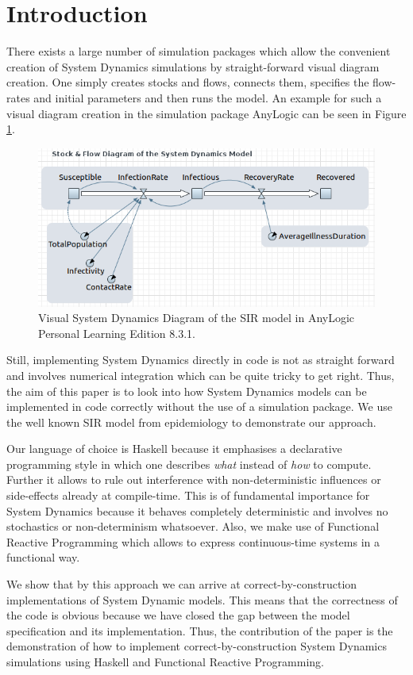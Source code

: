 \section{Introduction}
There exists a large number of simulation packages which allow the convenient creation of System Dynamics simulations by straight-forward visual diagram creation. One simply creates stocks and flows, connects them, specifies the flow-rates and initial parameters and then runs the model. An example for such a visual diagram creation in the simulation package AnyLogic can be seen in Figure \ref{fig:sir_stockflow_diagram}.

\begin{figure}
	\centering
	\includegraphics[width=.5\textwidth, angle=0]{./fig/SIR_SD_STOCKFLOW_DIAGRAMM.png}
	\caption{Visual System Dynamics Diagram of the SIR model in AnyLogic Personal Learning Edition 8.3.1.}
	\label{fig:sir_stockflow_diagram}
\end{figure}

Still, implementing System Dynamics directly in code is not as straight forward and involves numerical integration which can be quite tricky to get right. Thus, the aim of this paper is to look into how System Dynamics models can be implemented in code correctly without the use of a simulation package. We use the well known SIR model \cite{kermack_contribution_1927} from epidemiology to demonstrate our approach.

Our language of choice is Haskell because it emphasises a declarative programming style in which one describes \textit{what} instead of \textit{how} to compute. Further it allows to rule out interference with non-deterministic influences or side-effects already at compile-time. This is of fundamental importance for System Dynamics because it behaves completely deterministic and involves no stochastics or non-determinism whatsoever. Also, we make use of Functional Reactive Programming which allows to express continuous-time systems in a functional way. 

We show that by this approach we can arrive at correct-by-construction implementations of System Dynamic models. This means that the correctness of the code is obvious because we have closed the gap between the model specification and its implementation. Thus, the contribution of the paper is the demonstration of how to implement correct-by-construction System Dynamics simulations using Haskell and Functional Reactive Programming.